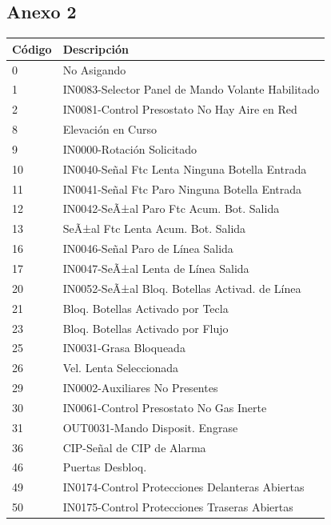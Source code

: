 \documentclass[10pt]{article}
\begin{document}
\subsection{Anexo 2}
\begin{table}[!ht]
    \centering
    \begin{tabular}{|l|l|}
    \hline
        Código & Descripción \\ \hline
        0 & No Asigando \\ \hline
        1 & IN0083-Selector Panel de Mando Volante Habilitado \\ \hline
        2 & IN0081-Control Presostato No Hay Aire en Red \\ \hline
        8 & Elevación en Curso \\ \hline
        9 & IN0000-Rotación Solicitado \\ \hline
        10 & IN0040-Señal Ftc Lenta Ninguna Botella Entrada \\ \hline
        11 & IN0041-Señal Ftc Paro Ninguna  Botella Entrada \\ \hline
        12 & IN0042-SeÃ±al Paro Ftc Acum. Bot. Salida \\ \hline
        13 & SeÃ±al Ftc Lenta Acum. Bot. Salida \\ \hline
        16 & IN0046-Señal Paro de  Lí­nea Salida \\ \hline
        17 & IN0047-SeÃ±al Lenta de Lí­nea Salida \\ \hline
        20 & IN0052-SeÃ±al Bloq. Botellas Activad. de Línea \\ \hline
        21 & Bloq. Botellas Activado por Tecla \\ \hline
        23 & Bloq. Botellas Activado por Flujo \\ \hline
        25 & IN0031-Grasa Bloqueada \\ \hline
        26 & Vel. Lenta Seleccionada \\ \hline
        29 & IN0002-Auxiliares No Presentes \\ \hline
        30 & IN0061-Control Presostato No Gas Inerte \\ \hline
        31 & OUT0031-Mando Disposit. Engrase \\ \hline
        36 & CIP-Señal de CIP de Alarma \\ \hline
        46 & Puertas Desbloq. \\ \hline
        49 & IN0174-Control Protecciones Delanteras Abiertas \\ \hline
        50 & IN0175-Control Protecciones Traseras Abiertas \\ \hline

\end{tabular}
\end{table}
\end{document}
